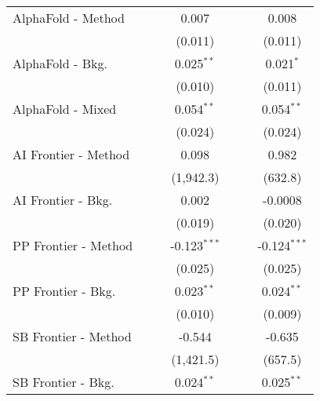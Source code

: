 \begin{tabular}{lcccccc}
   AlphaFold - Method           &               &             & 0.007          &               &         & 0.008\\   
                                &               &             & (0.011)        &               &         & (0.011)\\   
   AlphaFold - Bkg.             &               &             & 0.025$^{**}$   &               &         & 0.021$^{*}$\\   
                                &               &             & (0.010)        &               &         & (0.011)\\   
   AlphaFold - Mixed            &               &             & 0.054$^{**}$   &               &         & 0.054$^{**}$\\   
                                &               &             & (0.024)        &               &         & (0.024)\\   
   AI Frontier - Method         &               &             & 0.098          &               &         & 0.982\\   
                                &               &             & (1,942.3)      &               &         & (632.8)\\   
   AI Frontier - Bkg.           &               &             & 0.002          &               &         & -0.0008\\   
                                &               &             & (0.019)        &               &         & (0.020)\\   
   PP Frontier - Method         &               &             & -0.123$^{***}$ &               &         & -0.124$^{***}$\\   
                                &               &             & (0.025)        &               &         & (0.025)\\   
   PP Frontier - Bkg.           &               &             & 0.023$^{**}$   &               &         & 0.024$^{**}$\\   
                                &               &             & (0.010)        &               &         & (0.009)\\   
   SB Frontier - Method         &               &             & -0.544         &               &         & -0.635\\   
                                &               &             & (1,421.5)      &               &         & (657.5)\\   
   SB Frontier - Bkg.           &               &             & 0.024$^{**}$   &               &         & 0.025$^{**}$\\   

\end{tabular}
